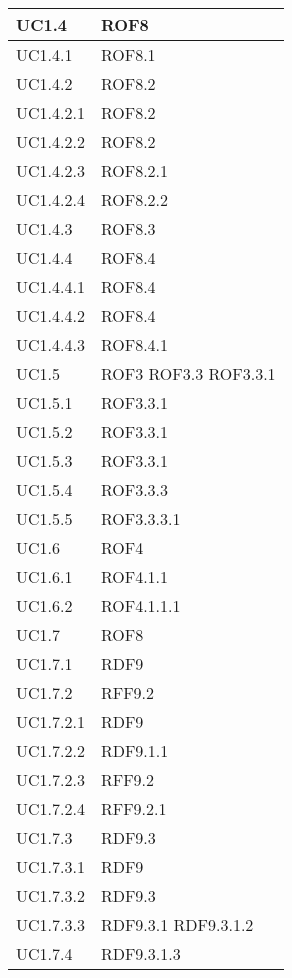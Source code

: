 \begin{center}
\begin{longtable}{| p{4cm} | p{4cm} |}
		\hline
		UC1.4  &  ROF8 \\
		\hline
		UC1.4.1  &  ROF8.1 \\
		\hline
		UC1.4.2  &  ROF8.2 \\
		\hline
		UC1.4.2.1  &  ROF8.2 \\
		\hline
		UC1.4.2.2  &  ROF8.2 \\
		\hline
		UC1.4.2.3  &  ROF8.2.1 \\
		\hline
		UC1.4.2.4  &  ROF8.2.2 \\
		\hline
		UC1.4.3  &  ROF8.3 \\
		\hline
		UC1.4.4  &  ROF8.4 \\
		\hline
		UC1.4.4.1  &  ROF8.4 \\
		\hline
		UC1.4.4.2  &  ROF8.4 \\
		\hline
		UC1.4.4.3  &  ROF8.4.1 \\
		\hline
		UC1.5  &  ROF3 \newline ROF3.3 \newline ROF3.3.1 \\
		\hline
		UC1.5.1  &  ROF3.3.1 \\
		\hline
		UC1.5.2  &  ROF3.3.1 \\
		\hline
		UC1.5.3  &  ROF3.3.1 \\
		\hline
		UC1.5.4  &  ROF3.3.3 \\
		\hline
		UC1.5.5  &  ROF3.3.3.1 \\
		\hline
		UC1.6  &  ROF4 \\
		\hline
		UC1.6.1  &  ROF4.1.1 \\
		\hline
		UC1.6.2  &  ROF4.1.1.1 \\
		\hline
		UC1.7  &  ROF8 \\
		\hline
		UC1.7.1  &  RDF9 \\
		\hline
		UC1.7.2  &  RFF9.2 \\
		\hline
		UC1.7.2.1  &  RDF9 \\
		\hline
		UC1.7.2.2  &  RDF9.1.1 \\
		\hline
		UC1.7.2.3  &  RFF9.2 \\
		\hline
		UC1.7.2.4  &  RFF9.2.1 \\
		\hline
		UC1.7.3  &  RDF9.3 \\
		\hline
		UC1.7.3.1  &  RDF9 \\
		\hline
		UC1.7.3.2  &  RDF9.3 \\
		\hline
		UC1.7.3.3  &  RDF9.3.1 \newline RDF9.3.1.2 \\
		\hline
		UC1.7.4  &  RDF9.3.1.3 \\

\end{longtable}
\end{center}
